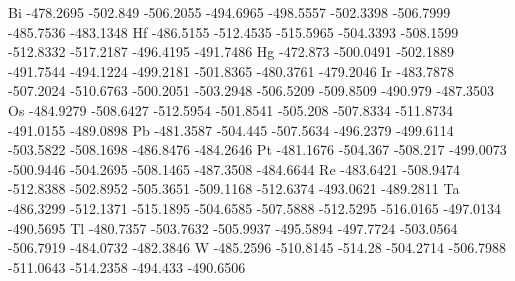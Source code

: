 Bi	-478.2695	-502.849	-506.2055	-494.6965	-498.5557	-502.3398	-506.7999	-485.7536	-483.1348
Hf	-486.5155	-512.4535	-515.5965	-504.3393	-508.1599	-512.8332	-517.2187	-496.4195	-491.7486
Hg	-472.873	-500.0491	-502.1889	-491.7544	-494.1224	-499.2181	-501.8365	-480.3761	-479.2046
Ir	-483.7878	-507.2024	-510.6763	-500.2051	-503.2948	-506.5209	-509.8509	-490.979	-487.3503
Os	-484.9279	-508.6427	-512.5954	-501.8541	-505.208	-507.8334	-511.8734	-491.0155	-489.0898
Pb	-481.3587	-504.445	-507.5634	-496.2379	-499.6114	-503.5822	-508.1698	-486.8476	-484.2646
Pt	-481.1676	-504.367	-508.217	-499.0073	-500.9446	-504.2695	-508.1465	-487.3508	-484.6644
Re	-483.6421	-508.9474	-512.8388	-502.8952	-505.3651	-509.1168	-512.6374	-493.0621	-489.2811
Ta	-486.3299	-512.1371	-515.1895	-504.6585	-507.5888	-512.5295	-516.0165	-497.0134	-490.5695
Tl	-480.7357	-503.7632	-505.9937	-495.5894	-497.7724	-503.0564	-506.7919	-484.0732	-482.3846
W	-485.2596	-510.8145	-514.28	-504.2714	-506.7988	-511.0643	-514.2358	-494.433	-490.6506


